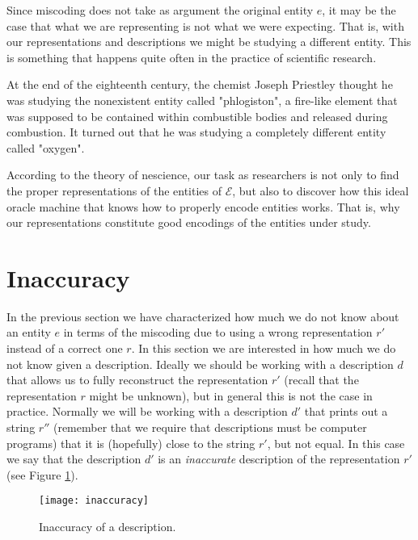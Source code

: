 Since miscoding does not take as argument the original entity $e$, it may be the case that what we are representing is not what we were expecting. That is, with our representations and descriptions we might be studying a different entity. This is something that happens quite often in the practice of scientific research. 

\begin{example}
At the end of the eighteenth century, the chemist Joseph Priestley thought he was studying the nonexistent entity called "phlogiston", a fire-like element that was supposed to be contained within combustible bodies and released during combustion. It turned out that he was studying a completely different entity called "oxygen".
\end{example}

According to the theory of nescience, our task as researchers is not only to find the proper representations of the entities of $\mathcal{E}$, but also to discover how this ideal oracle machine that knows how to properly encode entities works. That is, why our representations constitute good encodings of the entities under study.

%
%

\section{Inaccuracy}
\label{sec:introduction:inaccuracy}

In the previous section we have characterized how much we do not know about an entity $e$ in terms of the miscoding due to using a wrong representation $r'$ instead of a correct one $r$. In this section we are interested in how much we do not know given a description. Ideally we should be working with a description $d$ that allows us to fully reconstruct the representation $r'$ (recall that the representation $r$ might be unknown), but in general this is not the case in practice. Normally we will be working with a description $d'$ that prints out a string $r''$ (remember that we require that descriptions must be computer programs) that it is (hopefully) close to the string $r'$, but not equal. In this case we say that the description $d'$ is an \emph{inaccurate} description of the representation $r'$ (see Figure \ref{fig:inaccuracy:inaccuracy:inaccuracy}).

\begin{figure}[h]
\centering\texttt{[image: inaccuracy]}
\caption{\label{fig:inaccuracy:inaccuracy:inaccuracy}Inaccuracy of a description.}
\end{figure}

